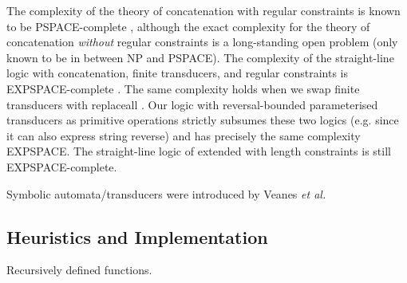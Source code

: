 The complexity of the theory of concatenation with regular constraints is
known to be PSPACE-complete \cite{Plandowski,J17}, although the exact
complexity for the theory of concatenation \emph{without} regular constraints is
a long-standing open problem (only known to be in between NP and PSPACE). 
The complexity of the straight-line logic with concatenation, finite
transducers, and regular constraints is EXPSPACE-complete \cite{LB16}. The same 
complexity holds when we swap finite transducers with replaceall 
\cite{CCHLW18}. Our logic with reversal-bounded parameterised transducers
as primitive operations strictly subsumes these two logics (e.g. since it can
also express string reverse) and has precisely the same complexity EXPSPACE.
The straight-line logic of \cite{LB16} extended with length constraints is still
EXPSPACE-complete.

Symbolic automata/transducers were introduced by Veanes \emph{et al.}
\cite{symbolic-transducer}

\subsection{Heuristics and Implementation}


Recursively defined functions.



